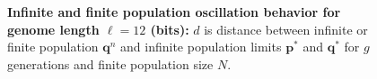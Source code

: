 \begin{figure}[H]
\begin{center}
{}


\caption{\textbf{Infinite and finite population oscillation behavior for genome length $\ell = 12$ (bits):} $d$ is
  distance between infinite or finite population ${\bm q}^n$ and infinite
  population limits ${{\bm p}^\ast}$ and ${{\bm q}^{\ast}}$ for $g$ generations and finite population size $N$.}
\label{oscillation_12}
\end{center}
\end{figure}

